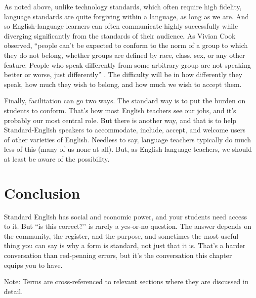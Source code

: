 As noted above, unlike technology standards, which often require high fidelity, language standards are quite forgiving within a language, as long as we are. And so English-language learners can often communicate highly successfully while diverging significantly from the standards of their audience. As Vivian Cook observed, \enquote{people can't be expected to conform to the norm of a group to which they do not belong, whether groups are defined by race, class, sex, or any other feature. People who speak differently from some arbitrary group are not speaking better or worse, just differently} \citep[194]{Cook1999}. The difficulty will be in how differently they speak, how much they wish to belong, and how much we wish to accept them.

Finally, facilitation can go two ways. The standard way is to put the burden on students to conform. That's how most English teachers see our jobs, and it's probably our most central role. But there is another way, and that is to help Standard-English speakers to accommodate, include, accept, and welcome users of other varieties of English. Needless to say, language teachers typically do much less of this (many of us none at all). But, as English-language teachers, we should at least be aware of the possibility.

\section{Conclusion}

Standard English has social and economic power, and your students need access to it. But \enquote{is this correct?} is rarely a yes-or-no question. The answer depends on the community, the register, and the purpose, and sometimes the most useful thing you can say is why a form is standard, not just that it is. That's a harder conversation than red-penning errors, but it's the conversation this chapter equips you to have.



\noindent Note: Terms are cross-referenced to relevant sections where they are discussed in detail.



